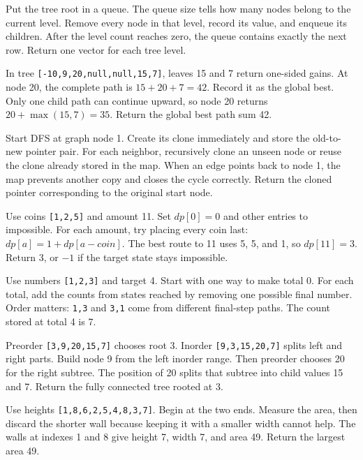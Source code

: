 \expandafter\def\csname lessontrace@7\endcsname{\visualtrace
  {Put the tree root in a queue. The queue size tells how many nodes belong to the current level.}
  {Remove every node in that level, record its value, and enqueue its children.}
  {After the level count reaches zero, the queue contains exactly the next row.}
  {Return one vector for each tree level.}}

\expandafter\def\csname lessontrace@8\endcsname{\visualtrace
  {In tree \texttt{[-10,9,20,null,null,15,7]}, leaves 15 and 7 return one-sided gains.}
  {At node 20, the complete path is \(15+20+7=42\). Record it as the global best.}
  {Only one child path can continue upward, so node 20 returns \(20+\max(15,7)=35\).}
  {Return the global best path sum 42.}}

\expandafter\def\csname lessontrace@9\endcsname{\visualtrace
  {Start DFS at graph node 1. Create its clone immediately and store the old-to-new pointer pair.}
  {For each neighbor, recursively clone an unseen node or reuse the clone already stored in the map.}
  {When an edge points back to node 1, the map prevents another copy and closes the cycle correctly.}
  {Return the cloned pointer corresponding to the original start node.}}

\expandafter\def\csname lessontrace@10\endcsname{\visualtrace
  {Use coins \texttt{[1,2,5]} and amount 11. Set \(dp[0]=0\) and other entries to impossible.}
  {For each amount, try placing every coin last: \(dp[a]=1+dp[a-coin]\).}
  {The best route to 11 uses 5, 5, and 1, so \(dp[11]=3\).}
  {Return 3, or \(-1\) if the target state stays impossible.}}

\expandafter\def\csname lessontrace@11\endcsname{\visualtrace
  {Use numbers \texttt{[1,2,3]} and target 4. Start with one way to make total 0.}
  {For each total, add the counts from states reached by removing one possible final number.}
  {Order matters: \texttt{1,3} and \texttt{3,1} come from different final-step paths.}
  {The count stored at total 4 is 7.}}

\expandafter\def\csname lessontrace@12\endcsname{\visualtrace
  {Preorder \texttt{[3,9,20,15,7]} chooses root 3. Inorder \texttt{[9,3,15,20,7]} splits left and right parts.}
  {Build node 9 from the left inorder range. Then preorder chooses 20 for the right subtree.}
  {The position of 20 splits that subtree into child values 15 and 7.}
  {Return the fully connected tree rooted at 3.}}

\expandafter\def\csname lessontrace@13\endcsname{\visualtrace
  {Use heights \texttt{[1,8,6,2,5,4,8,3,7]}. Begin at the two ends.}
  {Measure the area, then discard the shorter wall because keeping it with a smaller width cannot help.}
  {The walls at indexes 1 and 8 give height 7, width 7, and area 49.}
  {Return the largest area 49.}}

